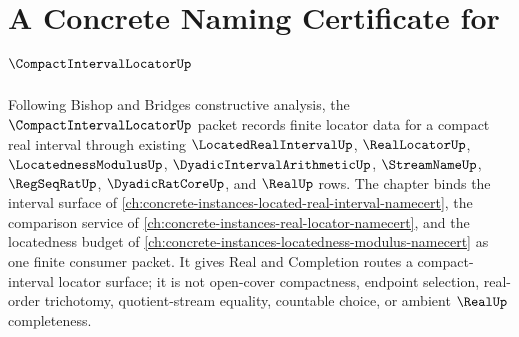 \chapter{A Concrete Naming Certificate for $\CompactIntervalLocatorUp$}
\label{ch:concrete-instances-compact-interval-locator-namecert}

Following Bishop and Bridges constructive analysis, the $\CompactIntervalLocatorUp$ packet records finite locator data for a compact real interval through existing $\LocatedRealIntervalUp$, $\RealLocatorUp$, $\LocatednessModulusUp$, $\DyadicIntervalArithmeticUp$, $\StreamNameUp$, $\RegSeqRatUp$, $\DyadicRatCoreUp$, and $\RealUp$ rows. The chapter binds the interval surface of \autoref{ch:concrete-instances-located-real-interval-namecert}, the comparison service of \autoref{ch:concrete-instances-real-locator-namecert}, and the locatedness budget of \autoref{ch:concrete-instances-locatedness-modulus-namecert} as one finite consumer packet. It gives Real and Completion routes a compact-interval locator surface; it is not open-cover compactness, endpoint selection, real-order trichotomy, quotient-stream equality, countable choice, or ambient $\RealUp$ completeness.

